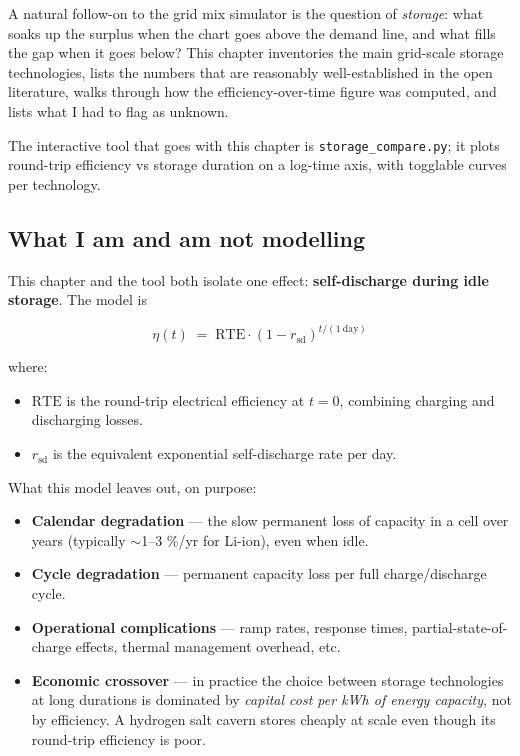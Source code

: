 A natural follow-on to the grid mix simulator is the question of
\emph{storage}: what soaks up the surplus when the chart goes above
the demand line, and what fills the gap when it goes below? This
chapter inventories the main grid-scale storage technologies, lists
the numbers that are reasonably well-established in the open
literature, walks through how the efficiency-over-time figure was
computed, and lists what I had to flag as unknown.

The interactive tool that goes with this chapter is
\texttt{storage\_compare.py}; it plots round-trip efficiency vs
storage duration on a log-time axis, with togglable curves per
technology.

\subsection*{What I am and am not modelling}

This chapter and the tool both isolate one effect:
\textbf{self-discharge during idle storage}. The model is

\[
\eta(t) \;=\; \mathrm{RTE} \cdot (1 - r_{\mathrm{sd}})^{t / (1\ \text{day})}
\]

where:

\begin{itemize}
    \item $\mathrm{RTE}$ is the round-trip electrical efficiency at
    $t=0$, combining charging and discharging losses.
    \item $r_{\mathrm{sd}}$ is the equivalent exponential
    self-discharge rate per day.
\end{itemize}

What this model leaves out, on purpose:

\begin{itemize}
    \item \textbf{Calendar degradation} --- the slow permanent loss
    of capacity in a cell over years (typically $\sim$1--3 \%/yr for
    Li-ion), even when idle.
    \item \textbf{Cycle degradation} --- permanent capacity loss per
    full charge/discharge cycle.
    \item \textbf{Operational complications} --- ramp rates,
    response times, partial-state-of-charge effects, thermal
    management overhead, etc.
    \item \textbf{Economic crossover} --- in practice the choice
    between storage technologies at long durations is dominated by
    \emph{capital cost per kWh of energy capacity}, not by
    efficiency. A hydrogen salt cavern stores cheaply at scale even
    though its round-trip efficiency is poor.
\end{itemize}

